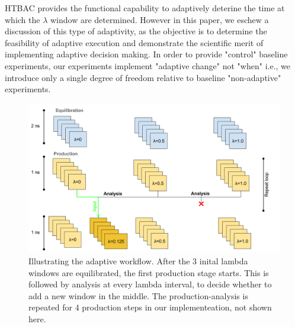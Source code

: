 

HTBAC provides the functional capability to adaptively deterine the time at
which the $\lambda$ window are determined. However in this paper, we eschew a
discussion of this type of adaptivity, as the objective is to determine the
feasibility of adaptive execution and demonstrate the scientific merit of
implementing adaptive decision making. In order to provide "control" baseline
experiments, our experiments implement "adaptive change" not "when" i.e., we
introduce only a single degree of freedom relative to baseline "non-adaptive"
experiments.

\begin{figure}
  \centering
   \includegraphics[width=\columnwidth]{figures/Adaptive_TIES_1.png}
  \caption{Illustrating the adaptive workflow. After the 3 inital lambda windows are equilibrated, the first production stage starts. This is followed by analysis at every lambda interval, to decide whether to add a new window in the middle. The production-analysis is repeated for 4 production steps in our implementeation, not shown here.}
\label{fig:adaptive_TIES}
\end{figure}

